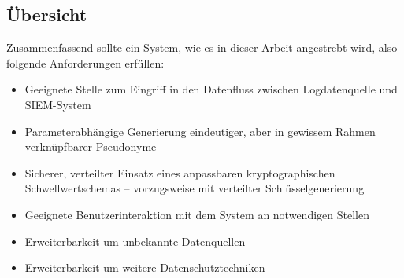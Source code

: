 
\subsection{Übersicht}

Zusammenfassend sollte ein System, wie es in dieser Arbeit angestrebt wird, also folgende Anforderungen erfüllen:

\begin{itemize}
  \item Geeignete Stelle zum Eingriff in den Datenfluss zwischen Logdatenquelle und SIEM-System
  \item Parameterabhängige Generierung eindeutiger, aber in gewissem Rahmen verknüpfbarer Pseudonyme
  \item Sicherer, verteilter Einsatz eines anpassbaren kryptographischen Schwellwertschemas -- vorzugsweise mit verteilter Schlüsselgenerierung
  \item Geeignete Benutzerinteraktion mit dem System an notwendigen Stellen
  \item Erweiterbarkeit um unbekannte Datenquellen
  \item Erweiterbarkeit um weitere Datenschutztechniken
\end{itemize}
